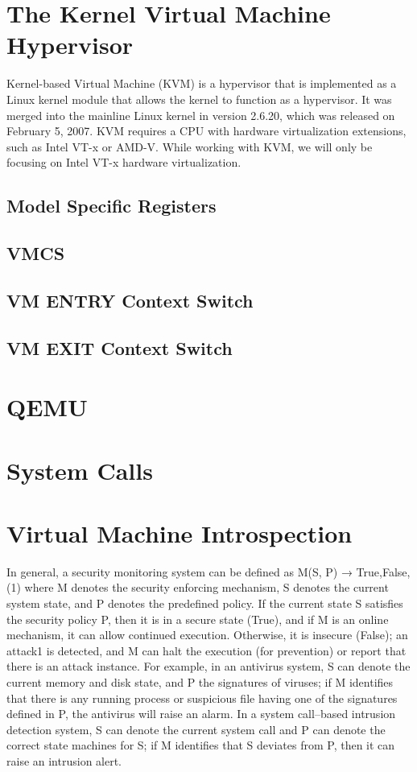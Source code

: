 \documentclass{report}
\begin{document}
\begin{spacing}{1.5}
\section{The Kernel Virtual Machine Hypervisor}


{\large 
Kernel-based Virtual Machine (KVM) is a hypervisor that is implemented as a Linux kernel module that allows the kernel to function as a hypervisor. It was merged into the mainline Linux kernel in version 2.6.20, which was released on February 5, 2007. KVM requires a CPU with hardware virtualization extensions, such as Intel VT-x or AMD-V. While working with KVM, we will only be focusing on Intel VT-x hardware virtualization.
\newline
}



\subsection{Model Specific Registers}
\subsection{VMCS}
\subsection{VM ENTRY Context Switch}
\subsection{VM EXIT Context Switch}
\section{QEMU}
\section{System Calls}
\section{Virtual Machine Introspection}

In general, a security monitoring system can be defined as
M(S, P) → {True,False}, (1)
where M denotes the security enforcing mechanism, S denotes the current system
state, and P denotes the predefined policy. If the current state S satisfies the security
policy P, then it is in a secure state (True), and if M is an online mechanism, it can
allow continued execution. Otherwise, it is insecure (False); an attack1 is detected, and
M can halt the execution (for prevention) or report that there is an attack instance.
For example, in an antivirus system, S can denote the current memory and disk state,
and P the signatures of viruses; if M identifies that there is any running process or
suspicious file having one of the signatures defined in P, the antivirus will raise an
alarm. In a system call–based intrusion detection system, S can denote the current
system call and P can denote the correct state machines for S; if M identifies that
S deviates from P, then it can raise an intrusion alert.



\end{spacing}
\end{document}
